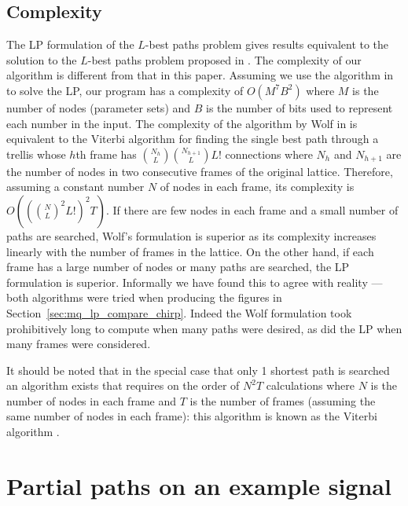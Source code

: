 \subsection{Complexity}

The LP formulation of the $L$-best paths problem gives results equivalent to the
solution to the $L$-best paths problem proposed in \cite{wolf1989finding}. The
complexity of our algorithm is different from that in this paper.  Assuming we
use the algorithm in \cite{karmarkar1984new} to solve the LP, our program has a
complexity of $O(M^{7}B^{2})$ where $M$ is the number of nodes (parameter sets)
and $B$ is the number of bits used to represent each number in the input. The
complexity of the algorithm by Wolf in \cite{wolf1989finding} is equivalent to
the Viterbi algorithm for finding the single best path through a trellis whose
$h$th frame has $\binom{N_{h}}{L}\binom{N_{h+1}}{L}L!$ connections where $N_{h}$
and $N_{h+1}$ are the number of nodes in two consecutive frames of the original
lattice. Therefore, assuming a constant number $N$ of nodes in each frame, its
complexity is $O((\binom{N}{L}^{2}L!)^{2}T)$. If there are few nodes in each
frame and a small number of paths are searched, Wolf's formulation is superior
as its complexity increases linearly with the number of frames in the lattice.
On the other hand, if each frame has a large number of nodes or many paths are
searched, the LP formulation is superior.  Informally we have found this to
agree with reality --- both algorithms were tried when producing the figures in
Section~\ref{sec:mq_lp_compare_chirp}.  Indeed the Wolf formulation took
prohibitively long to compute when many paths were desired, as did the LP when
many frames were considered.

It should be noted that in the special case that only 1 shortest path is
searched an algorithm exists that requires on the order of $N^{2}T$ calculations
\cite{rabiner1989tutorial} where $N$ is the number of nodes in each frame and
$T$ is the number of frames (assuming the same number of nodes in each frame):
this algorithm is known as the Viterbi algorithm \cite{forney1973viterbi}.

\section{Partial paths on an example signal\label{sec:mq_lp_compare_chirp}}

